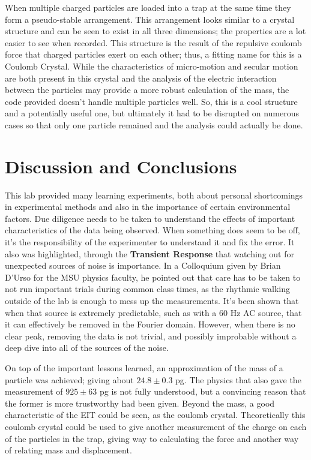 \documentclass[12pt]{article}
\begin{document}
When multiple charged particles are loaded into a trap at the same time they form a pseudo-stable arrangement. This arrangement looks similar to a crystal structure and can be seen to exist in all three dimensions; the properties are a lot easier to see when recorded. This structure is the result of the repulsive coulomb force that charged particles exert on each other; thus, a fitting name for this is a Coulomb Crystal. While the characteristics of micro-motion and secular motion are both present in this crystal and the analysis of the electric interaction between the particles may provide a more robust calculation of the mass, the code provided doesn't handle multiple particles well. So, this is a cool structure and a potentially useful one, but ultimately it had to be disrupted on numerous cases so that only one particle remained and the analysis could actually be done. 



\section{Discussion and Conclusions}

This lab provided many learning experiments, both about personal shortcomings in experimental methods and also in the importance of certain environmental factors. Due diligence needs to be taken to understand the effects of important characteristics of the data being observed. When something does seem to be off, it's the responsibility of the experimenter to understand it and fix the error. It also was highlighted, through the \textbf{Transient Response} that watching out for unexpected sources of noise is importance. In a Colloquium given by Brian D'Urso for the MSU physics faculty, he pointed out that care has to be taken to not run important trials during common class times, as the rhythmic walking outside of the lab is enough to mess up the measurements. It's been shown that when that source is extremely predictable, such as with a 60 Hz AC source, that it can effectively be removed in the Fourier domain. However, when there is no clear peak, removing the data is not trivial, and possibly improbable without a deep dive into all of the sources of the noise. 

On top of the important lessons learned, an approximation of the mass of a particle was achieved; giving about $24.8 \pm 0.3$ pg. The physics that also gave the measurement of $925 \pm 63$ pg is not fully understood, but a convincing reason that the former is more trustworthy had been given. Beyond the mass, a good characteristic of the EIT could be seen, as the coulomb crystal. Theoretically this coulomb crystal could be used to give another measurement of the charge on each of the particles in the trap, giving way to calculating the force and another way of relating mass and displacement.
\end{document}
